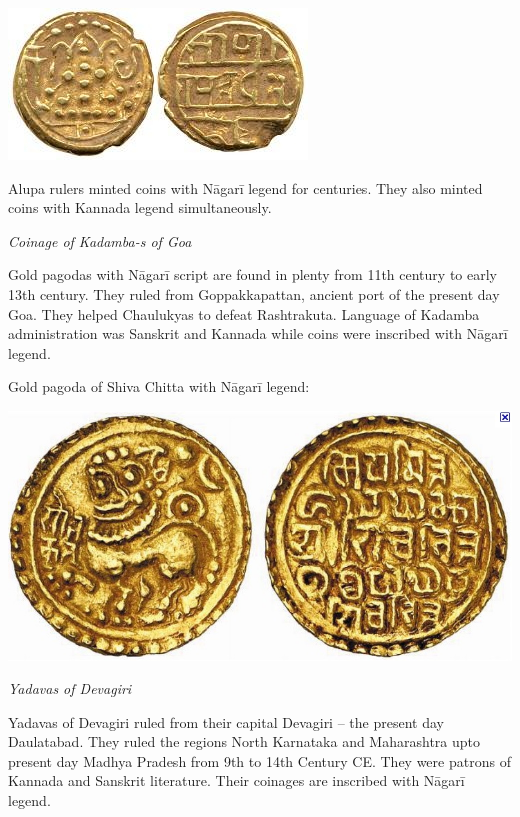 \vskip 3pt

\centerline{\includegraphics[scale=0.53]{"images/article-06/art06-fig15.jpg"}}

Alupa rulers minted coins with Nāgarī legend for centuries. They also minted coins with Kannada legend simultaneously.

\textit{Coinage of Kadamba-s of Goa}

Gold pagodas with Nāgarī script are found in plenty from 11th century to early 13th century. They ruled from Goppakkapattan, ancient port of the present day Goa. They helped Chaulukyas to defeat Rashtrakuta. Language of Kadamba administration was Sanskrit and Kannada while coins were inscribed with Nāgarī legend.

Gold pagoda of Shiva Chitta with Nāgarī legend:

\vskip 3pt

\centerline{\includegraphics[scale=0.6]{"images/article-06/art06-fig16.jpg"}}

\textit{Yadavas of Devagiri}

Yadavas of Devagiri ruled from their capital Devagiri – the present day Daulatabad. They ruled the regions North Karnataka and Maharashtra upto present day Madhya Pradesh from 9th to 14th Century CE. They were patrons of Kannada and Sanskrit literature. Their coinages are inscribed with Nāgarī legend.

